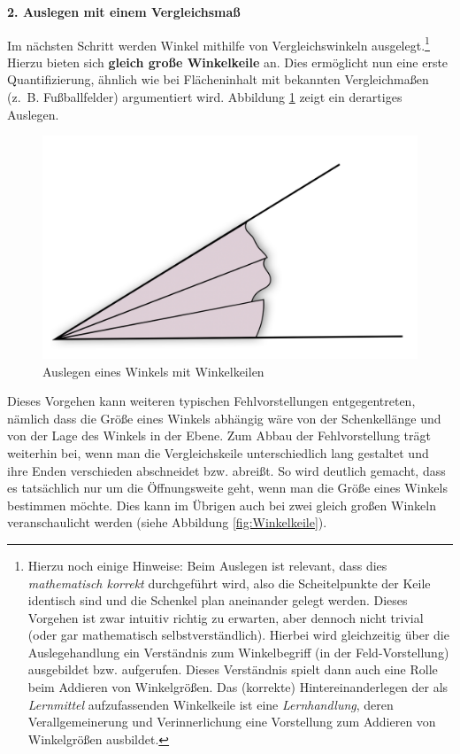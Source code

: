 \documentclass[
]{scrbook}
\theoremstyle{definition}
\theoremstyle{definition}
\theoremstyle{definition}
\theoremstyle{definition}
\theoremstyle{remark}
\begin{document}
\textbf{2. Auslegen mit einem Vergleichsmaß}

Im nächsten Schritt werden Winkel mithilfe von Vergleichswinkeln ausgelegt.\footnote{Hierzu noch einige Hinweise: Beim Auslegen ist relevant, dass dies \emph{mathematisch korrekt} durchgeführt wird, also die Scheitelpunkte der Keile identisch sind und die Schenkel plan aneinander gelegt werden. Dieses Vorgehen ist zwar intuitiv richtig zu erwarten, aber dennoch nicht trivial (oder gar mathematisch selbstverständlich). Hierbei wird gleichzeitig über die Auslegehandlung ein Verständnis zum Winkelbegriff (in der Feld-Vorstellung) ausgebildet bzw. aufgerufen. Dieses Verständnis spielt dann auch eine Rolle beim Addieren von Winkelgrößen. Das (korrekte) Hintereinanderlegen der als \emph{Lernmittel} aufzufassenden Winkelkeile ist eine \emph{Lernhandlung}, deren Verallgemeinerung und Verinnerlichung eine Vorstellung zum Addieren von Winkelgrößen ausbildet.} Hierzu bieten sich \textbf{gleich große Winkelkeile} an. Dies ermöglicht nun eine erste Quantifizierung, ähnlich wie bei Flächeninhalt mit bekannten Vergleichmaßen (z.~B. Fußballfelder) argumentiert wird. Abbildung \ref{fig:Winkelauslegen} zeigt ein derartiges Auslegen.

\begin{figure}

{\centering \includegraphics[width=0.5\linewidth]{pictures/11-Winkelauslegen} 

}

\caption{Auslegen eines Winkels mit Winkelkeilen}\label{fig:Winkelauslegen}
\end{figure}

Dieses Vorgehen kann weiteren typischen Fehlvorstellungen entgegentreten, nämlich dass die Größe eines Winkels abhängig wäre von der Schenkellänge und von der Lage des Winkels in der Ebene. Zum Abbau der Fehlvorstellung trägt weiterhin bei, wenn man die Vergleichskeile unterschiedlich lang gestaltet und ihre Enden verschieden abschneidet bzw. abreißt. So wird deutlich gemacht, dass es tatsächlich nur um die Öffnungsweite geht, wenn man die Größe eines Winkels bestimmen möchte. Dies kann im Übrigen auch bei zwei gleich großen Winkeln veranschaulicht werden (siehe Abbildung \ref{fig:Winkelkeile}).
\end{document}
